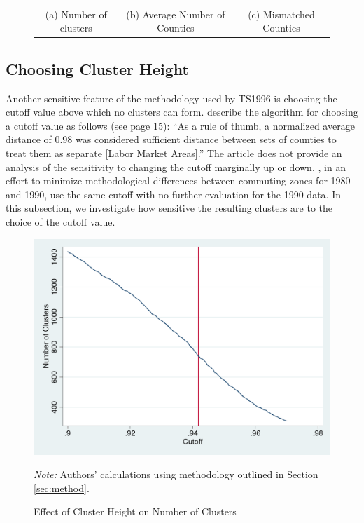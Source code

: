 \begin{figure}
\begin{tabular}{ccc}
(a) Number of clusters & (b) Average Number of Counties & (c) Mismatched Counties \\
\end{tabular}
\end{figure}

\subsection{Choosing Cluster Height}

Another sensitive feature of the methodology used by TS1996 is choosing the cutoff value above which no clusters can form. \cite{TK1987} describe the algorithm for choosing a cutoff value as follows (see page 15): ``As a rule of thumb, a normalized average distance of 0.98 was considered sufficient distance between sets of counties to treat them as separate [Labor Market Areas].'' The article does not provide an analysis of the sensitivity to changing the cutoff marginally up or down. \cite{TS1996}, in an effort to minimize methodological differences between commuting zones for 1980 and 1990, use the same cutoff with no further evaluation for the 1990 data. In this subsection, we investigate how sensitive the resulting clusters are to the choice of the cutoff value.

\begin{figure}
\includegraphics[scale=0.2]{./figures/numclus_cutoff.png}
\caption{Effect of Cluster Height on Number of Clusters \label{fig:cutoff_count}}
\emph{Note:} Authors' calculations using methodology outlined in Section \ref{sec:method}.
\end{figure}

